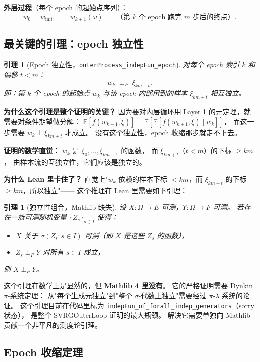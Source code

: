 \documentclass[11pt]{article}
\newtheorem{lemma}[theorem]{引理}
\theoremstyle{remark}
\begin{document}
\textbf{外层过程}（每个 epoch 的起始点序列）：
\[
  w_0 = w_{\text{init}}, \qquad
  w_{k+1}(\omega) \;=\; \text{（第 $k$ 个 epoch 跑完 $m$ 步后的终点）}.
\]

\subsection{最关键的引理：epoch 独立性}

\begin{lemma}[Epoch 独立性，\texttt{outerProcess\_indepFun\_epoch}]
  \label{lem:epoch-indep}
  对每个 epoch 索引 $k$ 和偏移 $t < m$：
  \[
    w_k \;\perp_P\; \xi_{km+t}.
  \]
  即：第 $k$ 个 epoch 的起始点 $w_k$ 与该 epoch 内部用到的样本 $\xi_{km+t}$ 相互独立。
\end{lemma}

\textbf{为什么这个引理是整个证明的关键？}
因为要对内层循环用 Layer 1 的元定理，就需要对条件期望做分解：
$\mathbb{E}[f(w_{k+1}, \xi)] = \mathbb{E}[\mathbb{E}[f(w_{k+1}, \xi) \mid w_k]]$，
而这一步需要 $w_k \perp \xi_{km+t}$ 才成立。
没有这个独立性，epoch 收缩那步就走不下去。

\textbf{证明的数学直觉：}
$w_k$ 是 $\xi_0, \ldots, \xi_{km-1}$ 的函数，
而 $\xi_{km+t}$（$t < m$）的下标 $\geq km$，
由样本流的互独立性，它们应该是独立的。

\textbf{为什么 Lean 里卡住了？}
直觉上"$w_k$ 依赖的样本下标 $< km$，而 $\xi_{km+t}$ 的下标 $\geq km$，所以独立"——
这个推理在 Lean 里需要如下引理：

\begin{lemma}[独立性组合，Mathlib 缺失]
  \label{lem:indep-comp}
  设 $X : \Omega \to E$ 可测，$Y : \Omega \to F$ 可测。
  若存在一族可测随机变量 $\{Z_s\}_{s \in I}$ 使得：
  \begin{itemize}
    \item $X$ 关于 $\sigma(Z_s : s \in I)$ 可测（即 $X$ 是这些 $Z_s$ 的函数），
    \item $Z_s \perp_P Y$ 对所有 $s \in I$ 成立，
  \end{itemize}
  则 $X \perp_P Y$。
\end{lemma}

这个引理在数学上是显然的，但 \textbf{Mathlib 4 里没有}。
它的严格证明需要 Dynkin $\pi$-系统定理：
从"每个生成元独立"到"整个 $\sigma$-代数上独立"需要经过 $\pi$-$\lambda$ 系统的论证。
这个引理目前在代码里标为 \texttt{indepFun\_of\_forall\_indep\_generators}（sorry 状态），
是整个 SVRGOuterLoop 证明的最大瓶颈。
解决它需要单独向 Mathlib 贡献一个非平凡的测度论引理。

\subsection{Epoch 收缩定理}
\end{document}
